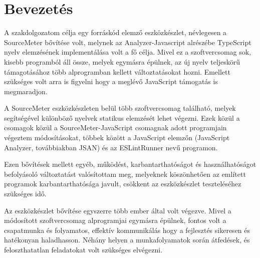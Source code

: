 \chapter{Bevezetés}
\label{chap:intro}

\noindent 
A szakdolgozatom célja egy forráskód elemző eszközkészlet, névlegesen a SourceMeter  bővítése volt, melynek az Analyzer-Javascript alrészébe TypeScript nyelv elemzésének implementálása volt a fő célja.
Mivel ez a szoftvercsomag sok, kisebb programból áll össze, melyek egymásra épülnek, az új nyelv teljeskörű támagotásához több alprogramban kellett változtatásokat hozni. Emellett szükséges volt arra is figyelni hogy a meglévő JavaScript támogatás is megmaradjon.

A SourceMeter eszközkészleten belül több szoftvercsomag található, melyek segítségével különböző nyelvek statikus elemzését lehet végezni. Ezek közül a csomagok közül a SourceMeter-JavaScript csomagnak adott programjain végeztem módosításokat, többek között a JavaScript elemzőn (JavaScript Analyzer, továbbiakban JSAN) és az ESLintRunner nevű programon. 

Ezen bővítések mellett egyéb, működést, karbantarthatóságot és használhatóságot befolyásoló változtatást valósítottam meg, melyeknek köszönhetően az említett programok karbantarthatósága javult, csökkent az eszközkészlet teszteléséhez szükséges idő.

Az eszközkészlet bővítése egyszerre több ember által volt végezve. Mivel a módosított szoftvercsomag alprogramjai egymásra épülnek, fontos volt a csapatmunka és folyamatos, effektív kommunikálás hogy a fejlesztés sikeresen és hatékonyan haladhasson. Néhány helyen a munkafolyamatok során átfedések, és feloszthatatlan feladatokat volt szükséges elvégezni. 